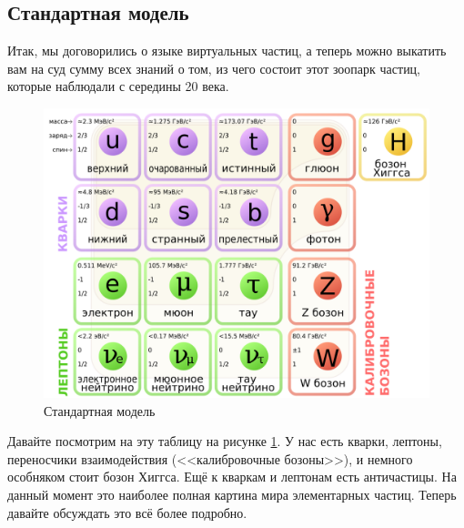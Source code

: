 \documentclass[12pt]{article}
\begin{document}
\subsection{Стандартная модель}
Итак, мы договорились о языке виртуальных частиц, а теперь можно выкатить вам на суд сумму всех знаний о том, из чего состоит этот зоопарк частиц, которые наблюдали с середины 20 века.
\begin{figure}[h]
    \centering
    \includegraphics[scale=0.43,keepaspectratio]{Seminar_11-12/pics/pic_01_standart_model.png}
    \caption{Стандартная модель}
    \label{fig:sem_11_model}
\end{figure}

Давайте посмотрим на эту таблицу  на рисунке \ref{fig:sem_11_model}. У нас есть кварки, лептоны, переносчики взаимодействия (<<калибровочные бозоны>>), и немного особняком стоит бозон Хиггса. Ещё к кваркам и лептонам есть античастицы. На данный момент это наиболее полная картина мира элементарных частиц. Теперь давайте обсуждать это всё более подробно.
\end{document}
